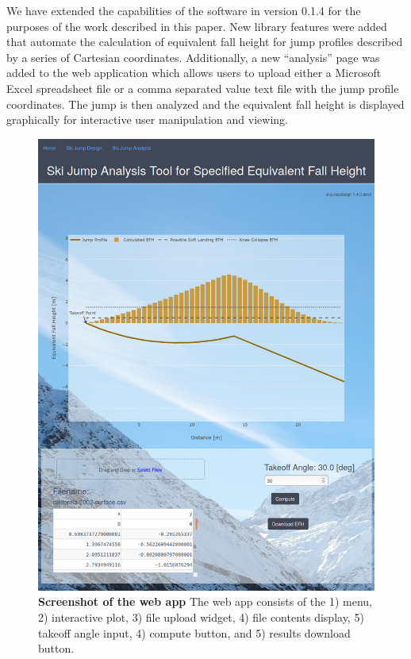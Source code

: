 \documentclass{article}
\begin{document}
We have extended the capabilities of the software in version 0.1.4 for the
purposes of the work described in this paper. New library features were added
that automate the calculation of equivalent fall height for jump profiles
described by a series of Cartesian coordinates. Additionally, a new
``analysis'' page was added to the web application which allows users to upload
either a Microsoft Excel spreadsheet file or a comma separated value text file
with the jump profile coordinates. The jump is then analyzed and the equivalent
fall height is displayed graphically for interactive user manipulation and
viewing.
%
\begin{figure}
  \centering
  \includegraphics[width=5.00in]{figures/web-app-screenshot.jpg}
  \caption{\textbf{Screenshot of the web app} The web app consists of the 1)
    menu, 2) interactive plot, 3) file upload widget, 4) file contents display,
    5) takeoff angle input, 4) compute button, and 5) results download button.}
  \label{fig:web-app-screenshot}
\end{figure}
\end{document}
